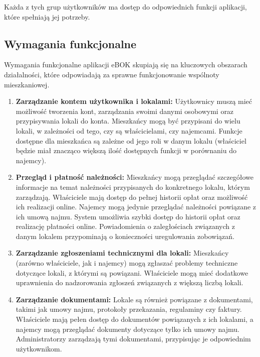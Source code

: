 Każda z tych grup użytkowników ma dostęp do odpowiednich funkcji aplikacji, które spełniają jej potrzeby.

\subsection{Wymagania funkcjonalne}

Wymagania funkcjonalne aplikacji eBOK skupiają się na kluczowych obszarach działalności, które odpowiadają za sprawne funkcjonowanie wspólnoty mieszkaniowej.

\begin{enumerate}[label=\arabic*.]

	\item \textbf{Zarządzanie kontem użytkownika i lokalami:} Użytkownicy muszą mieć możliwość tworzenia kont, zarządzania swoimi danymi osobowymi oraz przypisywania lokali do konta. Mieszkańcy mogą być przypisani do wielu lokali, w zależności od tego, czy są właścicielami, czy najemcami. Funkcje dostępne dla mieszkańca są zależne od jego roli w danym lokalu (właściciel będzie miał znacząco większą ilość dostępnych funkcji w porównaniu do najemcy).

	\item \textbf{Przegląd i płatność należności:} Mieszkańcy mogą przeglądać szczegółowe informacje na temat należności przypisanych do konkretnego lokalu, którym zarządzają. Właściciele mają dostęp do pełnej historii opłat oraz możliwość ich realizacji online. Najemcy mogą jedynie przeglądać należności powiązane z ich umową najmu. System umożliwia szybki dostęp do historii opłat oraz realizację płatności online. Powiadomienia o zaległościach związanych z danym lokalem przypominają o konieczności uregulowania zobowiązań.

	\item \textbf{Zarządzanie zgłoszeniami technicznymi dla lokali:} Mieszkańcy (zarówno właściciele, jak i najemcy) mogą zgłaszać problemy techniczne dotyczące lokali, z którymi są powiązani. Właściciele mogą mieć dodatkowe uprawnienia do nadzorowania zgłoszeń związanych z większą liczbą lokali.

	\item \textbf{Zarządzanie dokumentami:} Lokale są również powiązane z dokumentami, takimi jak umowy najmu, protokoły przekazania, regulaminy czy faktury. Właściciele mają pełen dostęp do dokumentów powiązanych z ich lokalami, a najemcy mogą przeglądać dokumenty dotyczące tylko ich umowy najmu. Administratorzy zarządzają tymi dokumentami, przypisując je odpowiednim użytkownikom.


\end{enumerate}
